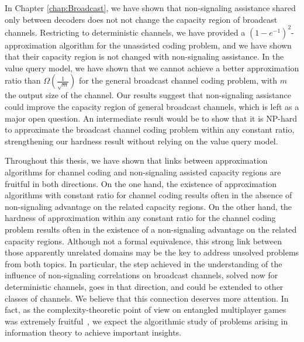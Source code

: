 In Chapter \ref{chap:Broadcast}, we have shown that non-signaling assistance shared only between decoders does not not change the capacity region of broadcast channels. Restricting to deterministic channels, we have provided a $(1-e^{-1})^2$-approximation algorithm for the unassisted coding problem, and we have shown that their capacity region is not changed with non-signaling assistance. In the value query model, we have shown that we cannot achieve a better approximation ratio than $\Omega\left(\frac{1}{\sqrt{m}}\right)$ for the general broadcast channel coding problem, with $m$ the output size of the channel. Our results suggest that non-signaling assistance could improve the capacity region of general broadcast channels, which is left as a major open question. An intermediate result would be to show that it is \textrm{NP}-hard to approximate the broadcast channel coding problem within any constant ratio, strengthening our hardness result without relying on the value query model.

Throughout this thesis, we have shown that links between approximation algorithms for channel coding and non-signaling assisted capacity regions are fruitful in both directions. On the one hand, the existence of approximation algorithms with constant ratio for channel coding results often in the absence of non-signaling advantage on the related capacity regions. On the other hand, the hardness of approximation within any constant ratio for the channel coding problem results often in the existence of a non-signaling advantage on the related capacity regions. Although not a formal equivalence, this strong link between those apparently unrelated domains may be the key to address unsolved problems from both topics. In particular, the step achieved in the understanding of the influence of non-signaling correlations on broadcast channels, solved now for deterministic channels, goes in that direction, and could be extended to other classes of channels. We believe that this connection deserves more attention. In fact, as the complexity-theoretic point of view on entangled multiplayer games was extremely fruitful~\cite{JNVWY20}, we expect the algorithmic study of problems arising in information theory to achieve important insights.

